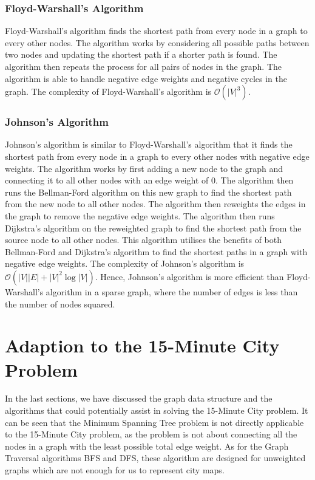 \subsubsection{Floyd-Warshall's Algorithm}

Floyd-Warshall's algorithm finds the shortest path from every node in a graph to every other nodes. The algorithm works by considering all possible paths between two nodes and updating the shortest path if a shorter path is found. The algorithm then repeats the process for all pairs of nodes in the graph. The algorithm is able to handle negative edge weights and negative cycles in the graph. The complexity of Floyd-Warshall's algorithm is $\mathcal{O}(|V|^3)$.

\subsubsection{Johnson's Algorithm}

Johnson's algorithm is similar to Floyd-Warshall's algorithm that it finds the shortest path from every node in a graph to every other nodes with negative edge weights. The algorithm works by first adding a new node to the graph and connecting it to all other nodes with an edge weight of $0$. The algorithm then runs the Bellman-Ford algorithm on this new graph to find the shortest path from the new node to all other nodes. The algorithm then reweights the edges in the graph to remove the negative edge weights. The algorithm then runs Dijkstra's algorithm on the reweighted graph to find the shortest path from the source node to all other nodes. This algorithm utilises the benefits of both Bellman-Ford and Dijkstra's algorithm to find the shortest paths in a graph with negative edge weights. The complexity of Johnson's algorithm is $\mathcal{O}(|V||E|+|V|^2\log |V|)$. Hence, Johnson's algorithm is more efficient than Floyd-Warshall's algorithm in a sparse graph, where the number of edges is less than the number of nodes squared.

\section{Adaption to the 15-Minute City Problem}

In the last sections, we have discussed the graph data structure and the algorithms that could potentially assist in solving the 15-Minute City problem. It can be seen that the Minimum Spanning Tree problem is not directly applicable to the 15-Minute City problem, as the problem is not about connecting all the nodes in a graph with the least possible total edge weight. As for the Graph Traversal algorithms BFS and DFS, these algorithm are designed for unweighted graphs which are not enough for us to represent city maps.


